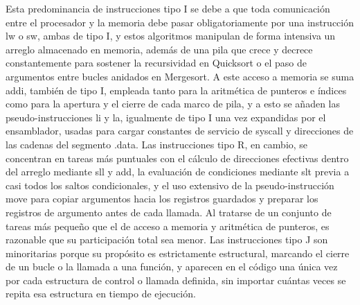 \documentclass[12pt, letterpaper]{article}
\begin{document}
Esta predominancia de instrucciones tipo I se debe a que toda comunicación entre el procesador y la memoria debe pasar obligatoriamente por una instrucción lw o sw, ambas de tipo I, y estos algoritmos manipulan de forma intensiva un arreglo almacenado en memoria, además de una pila que crece y decrece constantemente para sostener la recursividad en Quicksort o el paso de argumentos entre bucles anidados en Mergesort. A este acceso a memoria se suma addi, también de tipo I, empleada tanto para la aritmética de punteros e índices como para la apertura y el cierre de cada marco de pila, y a esto se añaden las pseudo-instrucciones li y la, igualmente de tipo I una vez expandidas por el ensamblador, usadas para cargar constantes de servicio de syscall y direcciones de las cadenas del segmento .data. Las instrucciones tipo R, en cambio, se concentran en tareas más puntuales con el cálculo de direcciones efectivas dentro del arreglo mediante sll y add, la evaluación de condiciones mediante slt previa a casi todos los saltos condicionales, y el uso extensivo de la pseudo-instrucción move para copiar argumentos hacia los registros guardados y preparar los registros de argumento antes de cada llamada. Al tratarse de un conjunto de tareas más pequeño que el de acceso a memoria y aritmética de punteros, es razonable que su participación total sea menor. Las instrucciones tipo J son minoritarias porque su propósito es estrictamente estructural, marcando el cierre de un bucle o la llamada a una función, y aparecen en el código una única vez por cada estructura de control o llamada definida, sin importar cuántas veces se repita esa estructura en tiempo de ejecución.
\end{document}
